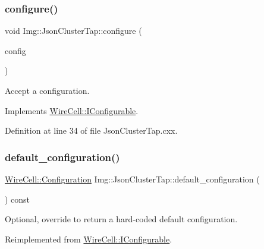 \subsubsection{\texorpdfstring{configure()}{configure()}}
{\footnotesize\ttfamily void Img\+::\+Json\+Cluster\+Tap\+::configure (\begin{DoxyParamCaption}\item[{const \hyperlink{namespace_wire_cell_a9f705541fc1d46c608b3d32c182333ee}{Wire\+Cell\+::\+Configuration} \&}]{config }\end{DoxyParamCaption})\hspace{0.3cm}{\ttfamily [virtual]}}



Accept a configuration. 



Implements \hyperlink{class_wire_cell_1_1_i_configurable_a57ff687923a724093df3de59c6ff237d}{Wire\+Cell\+::\+I\+Configurable}.



Definition at line 34 of file Json\+Cluster\+Tap.\+cxx.

\mbox{\label{class_wire_cell_1_1_img_1_1_json_cluster_tap_adb6f4733f50d1468075362142f097278}} 
\subsubsection{\texorpdfstring{default\+\_\+configuration()}{default\_configuration()}}
{\footnotesize\ttfamily \hyperlink{namespace_wire_cell_a9f705541fc1d46c608b3d32c182333ee}{Wire\+Cell\+::\+Configuration} Img\+::\+Json\+Cluster\+Tap\+::default\+\_\+configuration (\begin{DoxyParamCaption}{ }\end{DoxyParamCaption}) const\hspace{0.3cm}{\ttfamily [virtual]}}



Optional, override to return a hard-\/coded default configuration. 



Reimplemented from \hyperlink{class_wire_cell_1_1_i_configurable_a54841b2da3d1ea02189478bff96f7998}{Wire\+Cell\+::\+I\+Configurable}.



